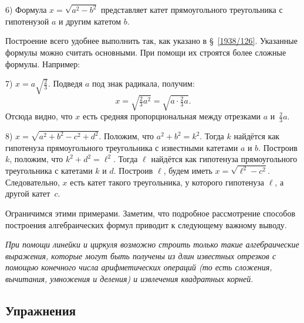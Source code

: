 \documentclass[oneside]{book}
\begin{document}
6) Формула $x=\sqrt{a^2-b^2}$ представляет катет прямоугольного треугольника с гипотенузой $a$ и другим катетом $b$.

Построение всего удобнее выполнить так, как указано в §~\ref{1938/126}.
Указанные формулы можно считать основными.
При помощи их строятся более сложные формулы.
Например:

7) $x=a\sqrt{\frac23}$.
Подведя $a$ под знак радикала, получим:
\[x=\sqrt{\tfrac23a^2}=\sqrt{a\cdot\tfrac23a}.\]
Отсюда видно, что $x$ есть средняя пропорциональная между отрезками $a$ и~$\tfrac23a$.

8) $x=\sqrt{a^2 + b^2 - c^2 + d^2}$.
Положим, что  $a^2+b^2=k^2$.
Тогда $k$ найдётся как гипотенуза прямоугольного треугольника с известными катетами $a$ и $b$.
Построив $k$, положим, что $k^2+d^2=\ell^2$.
Тогда $\ell$ найдётся как гипотенуза прямоугольного треугольника с катетами $k$ и $d$.
Построив $\ell$, будем иметь $x=\sqrt{\ell^2-c^2}$.
Следовательно, $x$ есть катет такого треугольника, у которого гипотенуза $\ell$, а другой катет~$c$.

Ограничимся этими примерами.
Заметим, что подробное рассмотрение способов построения алгебраических формул приводит к следующему важному выводу.

\emph{При помощи линейки и циркуля возможно строить только такие алгебраические выражения, которые могут быть получены из длин известных отрезков с помощью конечного числа арифметических операций \emph{(то есть сложения, вычитания, умножения и деления)} 
и извлечения квадратных корней}.

\subsection*{Упражнения}

\begin{center}
\end{center}
\end{document}
